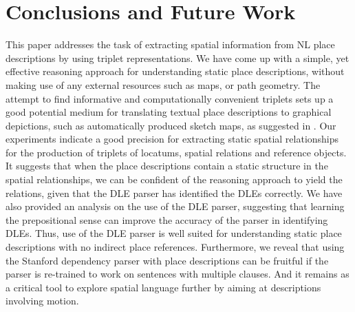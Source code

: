 \documentclass{acm_proc_article-sp}
\begin{document}
\section{Conclusions and Future Work}
\label{sec:conclusion}
This paper addresses the task of extracting spatial information from NL place descriptions by using triplet representations. We have come up with a simple, yet effective reasoning approach for understanding static place descriptions, without making use of any external resources such as maps, or path geometry. The attempt to find informative and computationally convenient triplets sets up a good potential medium for translating textual place descriptions to graphical depictions, such as automatically produced sketch maps, as suggested in \cite{maria:descriptions} . Our experiments indicate a good precision for extracting static spatial relationships for the production of triplets of locatums, spatial relations and reference objects. It suggests that when the place descriptions contain a static structure in the spatial relationships, we can be confident of the reasoning approach to yield the relations, given that the DLE parser has identified the DLEs correctly. We have also provided an analysis on the use of the DLE parser, suggesting that learning the prepositional sense can improve the accuracy of the parser in identifying DLEs. Thus, use of the DLE parser is well suited for understanding static place descriptions with no indirect place references. Furthermore, we reveal that using the Stanford dependency parser with place descriptions can be fruitful if the parser is re-trained to work on sentences with multiple clauses. And it remains as a critical tool to explore spatial language further by aiming at descriptions involving motion. 
\end{document}
